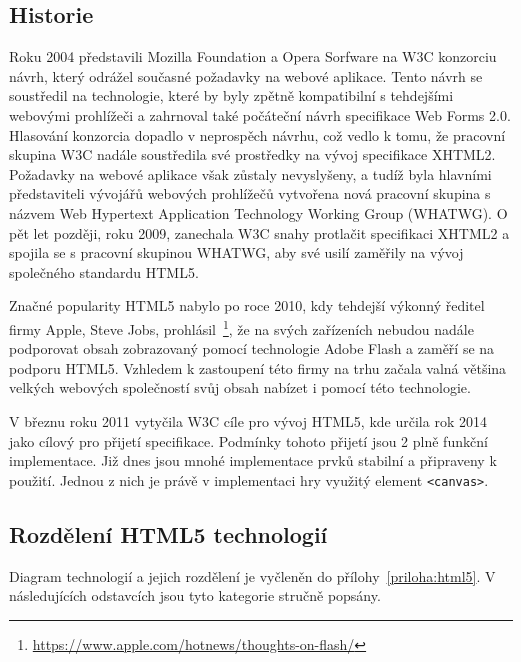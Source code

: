 \subsection*{Historie}
\label{subsection:historieHTML5}
Roku 2004 představili Mozilla Foundation a Opera Sorfware na W3C konzorciu návrh, který odrážel současné požadavky na webové aplikace. Tento návrh se soustředil na technologie, které by byly zpětně kompatibilní s tehdejšími webovými prohlížeči a zahrnoval také počáteční návrh specifikace Web Forms 2.0. Hlasování konzorcia dopadlo v neprospěch návrhu, což vedlo k tomu, že pracovní skupina W3C nadále soustředila své prostředky na vývoj specifikace XHTML2. Požadavky na webové aplikace však zůstaly nevyslyšeny, a tudíž byla hlavními představiteli vývojářů webových prohlížečů vytvořena nová pracovní skupina s názvem Web Hypertext Application Technology Working Group (WHATWG). O pět let později, roku 2009, zanechala W3C snahy protlačit specifikaci XHTML2 a spojila se s pracovní skupinou WHATWG, aby své usilí zaměřily na vývoj společného standardu HTML5.~\cite{pilgrim2010html5, macdonald2011html5, lubbers2011pro}

Značné popularity HTML5 nabylo po roce 2010, kdy tehdejší výkonný ředitel firmy Apple, Steve Jobs, prohlásil~\footnote{\url{https://www.apple.com/hotnews/thoughts-on-flash/}}, že na svých zařízeních nebudou nadále podporovat obsah zobrazovaný pomocí technologie Adobe Flash a zaměří se na podporu HTML5. Vzhledem k zastoupení této firmy na trhu začala valná většina velkých webových společností svůj obsah nabízet i pomocí této technologie.

V březnu roku 2011 vytyčila W3C cíle pro vývoj HTML5, kde určila rok 2014 jako cílový pro přijetí specifikace. Podmínky tohoto přijetí jsou 2 plně funkční implementace. Již dnes jsou mnohé implementace prvků stabilní a připraveny k použití. Jednou z nich je právě v implementaci hry využitý element \texttt{<canvas>}.


\subsection*{Rozdělení HTML5 technologií}
\label{subsection:rozdeleniHTML5}
Diagram technologií a jejich rozdělení je vyčleněn do přílohy~\ref{priloha:html5}. V následujících odstavcích jsou tyto kategorie stručně popsány. \\

